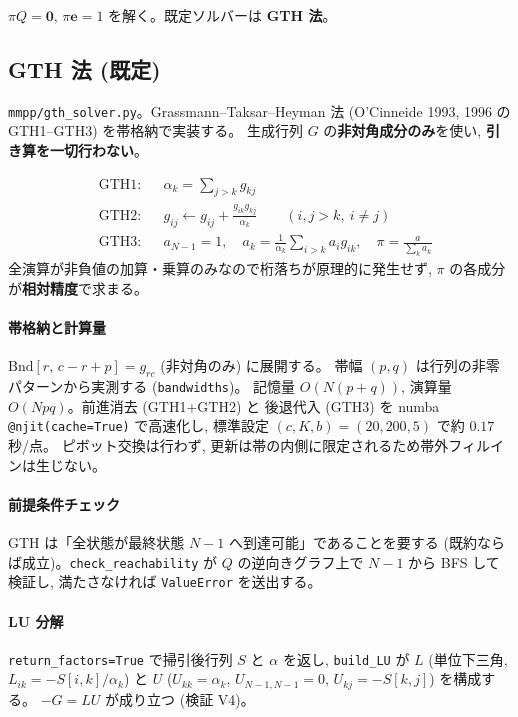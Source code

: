 \documentclass[a4paper,11pt]{article}
\newcommand{\code}[1]{\texttt{#1}}
\begin{document}
$\pi Q=\mathbf{0}$, $\pi\mathbf{e}=1$ を解く。既定ソルバーは \textbf{GTH 法}。

\subsection{GTH 法 (既定)}

\code{mmpp/gth\_solver.py}。Grassmann--Taksar--Heyman 法
(O'Cinneide 1993, 1996 の GTH1--GTH3) を帯格納で実装する。
生成行列 $G$ の\textbf{非対角成分のみ}を使い, \textbf{引き算を一切行わない}。

\begin{align}
  &\text{GTH1:} && \alpha_k=\sum_{j>k} g_{kj} \\
  &\text{GTH2:} && g_{ij}\leftarrow g_{ij}+\frac{g_{ik}g_{kj}}{\alpha_k}
  \qquad (i,j>k,\ i\ne j) \\
  &\text{GTH3:} && a_{N-1}=1,\quad
  a_k=\frac{1}{\alpha_k}\sum_{i>k} a_i g_{ik},\quad
  \pi=\frac{a}{\sum_k a_k}
\end{align}
全演算が非負値の加算・乗算のみなので桁落ちが原理的に発生せず,
$\pi$ の各成分が\textbf{相対精度}で求まる。

\paragraph{帯格納と計算量}
$\mathrm{Bnd}[r,\,c-r+p]=g_{rc}$ (非対角のみ) に展開する。
帯幅 $(p,q)$ は行列の非零パターンから実測する (\code{bandwidths})。
記憶量 $O(N(p+q))$, 演算量 $O(Npq)$。前進消去 (GTH1+GTH2) と
後退代入 (GTH3) を numba \code{@njit(cache=True)} で高速化し,
標準設定 $(c,K,b)=(20,200,5)$ で約 $0.17$ 秒/点。
ピボット交換は行わず, 更新は帯の内側に限定されるため帯外フィルインは生じない。

\paragraph{前提条件チェック}
GTH は「全状態が最終状態 $N-1$ へ到達可能」であることを要する
(既約ならば成立)。\code{check\_reachability} が $Q$ の逆向きグラフ上で
$N-1$ から BFS して検証し, 満たさなければ \code{ValueError} を送出する。

\paragraph{LU 分解}
\code{return\_factors=True} で掃引後行列 $S$ と $\alpha$ を返し,
\code{build\_LU} が $L$ (単位下三角, $L_{ik}=-S[i,k]/\alpha_k$) と
$U$ ($U_{kk}=\alpha_k$, $U_{N-1,N-1}=0$, $U_{kj}=-S[k,j]$) を構成する。
$-G=LU$ が成り立つ (検証 V4)。
\end{document}
